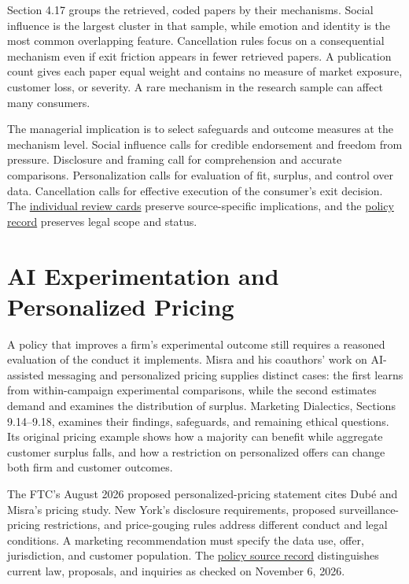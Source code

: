 \noindent \noindent Section 4.17 groups the retrieved, coded papers by their
mechanisms. Social influence is the largest cluster in that sample,
while emotion and identity is the most common overlapping feature.
Cancellation rules focus on a consequential mechanism even if exit
friction appears in fewer retrieved papers. A publication count gives
each paper equal weight and contains no measure of market exposure,
customer loss, or severity. A rare mechanism in the research sample can
affect many consumers.

The managerial implication is to select safeguards and outcome measures
at the mechanism level. Social influence calls for credible endorsement
and freedom from pressure. Disclosure and framing call for comprehension
and accurate comparisons. Personalization calls for evaluation of fit,
surplus, and control over data. Cancellation calls for effective
execution of the consumer's exit decision. The
\href{../01_Resources/13_Consumer_Agency_and_Recent_Research/CATALOG.md}{individual
review cards} preserve source-specific implications, and the
\href{../01_Resources/13_Consumer_Agency_and_Recent_Research/Policy/README.md}{policy
record} preserves legal scope and status.

\hypertarget{M08-ai-experimentation-and-personalized-pricing}{%
\section{AI Experimentation and Personalized
Pricing}\label{M08-ai-experimentation-and-personalized-pricing}}

\noindent A policy that improves a firm's experimental outcome still requires a
reasoned evaluation of the conduct it implements. Misra and his
coauthors' work on AI-assisted messaging and personalized pricing
supplies distinct cases: the first learns from within-campaign
experimental comparisons, while the second estimates demand and examines
the distribution of surplus. Marketing Dialectics, Sections 9.14--9.18,
examines their findings, safeguards, and remaining ethical questions.
Its original pricing example shows how a majority can benefit while
aggregate customer surplus falls, and how a restriction on personalized
offers can change both firm and customer outcomes.

The FTC's August 2026 proposed personalized-pricing statement cites Dubé
and Misra's pricing study. New York's disclosure requirements, proposed
surveillance-pricing restrictions, and price-gouging rules address
different conduct and legal conditions. A marketing recommendation must
specify the data use, offer, jurisdiction, and customer population. The
\href{../01_Resources/16_AI_Experimentation_and_Pricing/02_Policy/README.md}{policy
source record} distinguishes current law, proposals, and inquiries as
checked on November 6, 2026.

